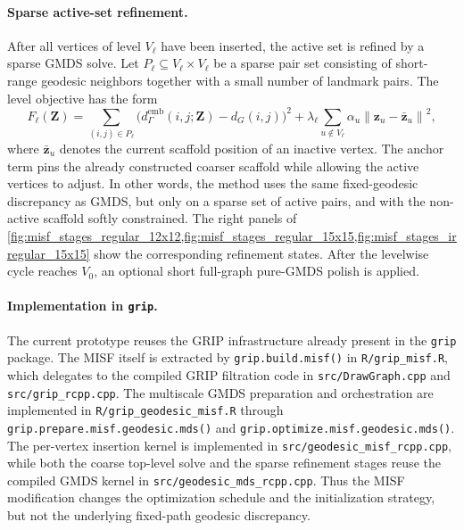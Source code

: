 \documentclass[11pt]{article}
\newcommand{\bz}{\mathbf{z}}
\newcommand{\bZ}{\mathbf{Z}}
\newcommand{\norm}[1]{\left\|#1\right\|}
\newcommand{\demb}{d^{\mathrm{emb}}}
\theoremstyle{definition}
\theoremstyle{plain}
\theoremstyle{remark}
\begin{document}
\paragraph{Sparse active-set refinement.}
After all vertices of level $V_\ell$ have been inserted, the active set is
refined by a sparse GMDS solve.  Let $P_\ell \subseteq V_\ell \times V_\ell$ be
a sparse pair set consisting of short-range geodesic neighbors together with a
small number of landmark pairs.  The level objective has the form
\[
  F_\ell(\bZ)
  =
  \sum_{(i,j)\in P_\ell}
  \bigl(
    \demb_{\Gamma}(i,j;\bZ) - d_G(i,j)
  \bigr)^2
  +
  \lambda_\ell
  \sum_{u \notin V_\ell}
  \alpha_u \norm{\bz_u - \bar{\bz}_u}^2,
\]
where $\bar{\bz}_u$ denotes the current scaffold position of an inactive
vertex.  The anchor term pins the already constructed coarser scaffold while
allowing the active vertices to adjust.  In other words, the method uses the
same fixed-geodesic discrepancy as GMDS, but only on a sparse set of active
pairs, and with the non-active scaffold softly constrained.  The right panels
of \cref{fig:misf_stages_regular_12x12,fig:misf_stages_regular_15x15,fig:misf_stages_irregular_15x15}
show the corresponding refinement states.  After the levelwise cycle reaches
$V_0$, an optional short full-graph pure-GMDS polish is applied.

\paragraph{Implementation in \texttt{grip}.}
The current prototype reuses the GRIP infrastructure already present in the
\texttt{grip} package.  The MISF itself is extracted by
\texttt{grip.build.misf()} in \texttt{R/grip\_misf.R}, which delegates to the
compiled GRIP filtration code in \texttt{src/DrawGraph.cpp} and
\texttt{src/grip\_rcpp.cpp}.  The multiscale GMDS preparation and orchestration
are implemented in \texttt{R/grip\_geodesic\_misf.R} through
\texttt{grip.prepare.misf.geodesic.mds()} and
\texttt{grip.optimize.misf.geodesic.mds()}.  The per-vertex insertion kernel is
implemented in \texttt{src/geodesic\_misf\_rcpp.cpp}, while both the coarse
top-level solve and the sparse refinement stages reuse the compiled GMDS kernel
in \texttt{src/geodesic\_mds\_rcpp.cpp}.  Thus the MISF modification changes the
optimization schedule and the initialization strategy, but not the underlying
fixed-path geodesic discrepancy.
\end{document}
